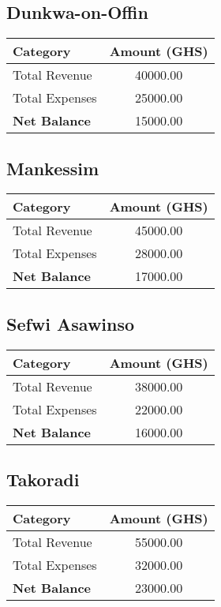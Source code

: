 \documentclass[a4paper,12pt]{article}
\begin{document}
\subsection*{Dunkwa-on-Offin}
\begin{tabular}{l S[table-format=6.2]}
    \toprule
    \textbf{Category} & \textbf{Amount (GHS)} \\
    \midrule
    Total Revenue & 40000.00 \\
    Total Expenses & 25000.00 \\
    \midrule
    \textbf{Net Balance} & 15000.00 \\
    \bottomrule
\end{tabular}

\subsection*{Mankessim}
\begin{tabular}{l S[table-format=6.2]}
    \toprule
    \textbf{Category} & \textbf{Amount (GHS)} \\
    \midrule
    Total Revenue & 45000.00 \\
    Total Expenses & 28000.00 \\
    \midrule
    \textbf{Net Balance} & 17000.00 \\
    \bottomrule
\end{tabular}

\subsection*{Sefwi Asawinso}
\begin{tabular}{l S[table-format=6.2]}
    \toprule
    \textbf{Category} & \textbf{Amount (GHS)} \\
    \midrule
    Total Revenue & 38000.00 \\
    Total Expenses & 22000.00 \\
    \midrule
    \textbf{Net Balance} & 16000.00 \\
    \bottomrule
\end{tabular}

\subsection*{Takoradi}
\begin{tabular}{l S[table-format=6.2]}
    \toprule
    \textbf{Category} & \textbf{Amount (GHS)} \\
    \midrule
    Total Revenue & 55000.00 \\
    Total Expenses & 32000.00 \\
    \midrule
    \textbf{Net Balance} & 23000.00 \\
    \bottomrule
\end{tabular}
\end{document}

